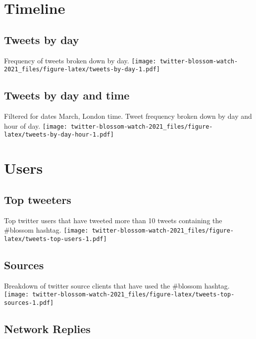 \documentclass[
]{article}
\begin{document}
\hypertarget{timeline}{%
\section{Timeline}\label{timeline}}

\hypertarget{tweets-by-day}{%
\subsection{Tweets by day}\label{tweets-by-day}}

Frequency of tweets broken down by day.
\texttt{[image: twitter-blossom-watch-2021\_files/figure-latex/tweets-by-day-1.pdf]}

\hypertarget{tweets-by-day-and-time}{%
\subsection{Tweets by day and time}\label{tweets-by-day-and-time}}

Filtered for dates March, London time. Tweet frequency broken down by
day and hour of day.
\texttt{[image: twitter-blossom-watch-2021\_files/figure-latex/tweets-by-day-hour-1.pdf]}

\hypertarget{users}{%
\section{Users}\label{users}}

\hypertarget{top-tweeters}{%
\subsection{Top tweeters}\label{top-tweeters}}

Top twitter users that have tweeted more than 10 tweets containing the
\#blossom hashtag.
\texttt{[image: twitter-blossom-watch-2021\_files/figure-latex/tweets-top-users-1.pdf]}

\hypertarget{sources}{%
\subsection{Sources}\label{sources}}

Breakdown of twitter source clients that have used the \#blossom
hashtag.
\texttt{[image: twitter-blossom-watch-2021\_files/figure-latex/tweets-top-sources-1.pdf]}

\hypertarget{network-replies}{%
\subsection{Network Replies}\label{network-replies}}
\end{document}
